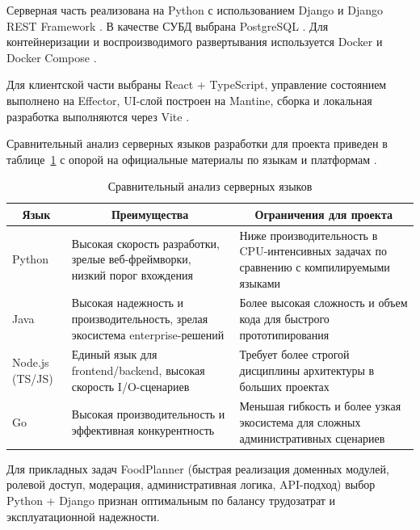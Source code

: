 Серверная часть реализована на Python с использованием Django и Django REST Framework \cite{python_docs_2026,django_docs_2026,drf_docs_2026}. В качестве СУБД выбрана PostgreSQL \cite{postgresql_docs_2026}. Для контейнеризации и воспроизводимого развертывания используется Docker и Docker Compose \cite{docker_docs_2026,docker_compose_docs_2026}.

Для клиентской части выбраны React + TypeScript, управление состоянием выполнено на Effector, UI-слой построен на Mantine, сборка и локальная разработка выполняются через Vite \cite{react_docs_2026,typescript_docs_2026,effector_docs_2026,mantine_docs_2026,vite_docs_2026}.

Сравнительный анализ серверных языков разработки для проекта приведен в таблице~\ref{tab:backend-lang-compare} с опорой на официальные материалы по языкам и платформам \cite{python_docs_2026,java_docs_2026,nodejs_docs_2026,go_docs_2026}.

\begin{table}[H]
\caption{Сравнительный анализ серверных языков}
\label{tab:backend-lang-compare}
\begin{tabularx}{\textwidth}{|p{}|p{}|X|}
\hline
\multicolumn{1}{|c|}{Язык} & \multicolumn{1}{c|}{Преимущества} & \multicolumn{1}{c|}{Ограничения для проекта} \\ \hline
Python & Высокая скорость разработки, зрелые веб-фреймворки, низкий порог вхождения & Ниже производительность в CPU-интенсивных задачах по сравнению с компилируемыми языками \\ \hline
Java & Высокая надежность и производительность, зрелая экосистема enterprise-решений & Более высокая сложность и объем кода для быстрого прототипирования \\ \hline
Node.js (TS/JS) & Единый язык для frontend/backend, высокая скорость I/O-сценариев & Требует более строгой дисциплины архитектуры в больших проектах \\ \hline
Go & Высокая производительность и эффективная конкурентность & Меньшая гибкость и более узкая экосистема для сложных административных сценариев \\ \hline
\end{tabularx}
\end{table}

Для прикладных задач FoodPlanner (быстрая реализация доменных модулей, ролевой доступ, модерация, административная логика, API-подход) выбор Python + Django признан оптимальным по балансу трудозатрат и эксплуатационной надежности.

